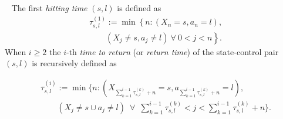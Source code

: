 \documentclass[opre,sglanonrev]{informs4}
\numberwithin{equation}{section}
\newcommand{\pow}[1]{^{(#1)}}
\newcommand{\lc}{\left\{}
\newcommand{\rc}{\right\}}
\newcommand{\ldot}{\left.}
\newcommand{\rdot}{\right.}
\begin{document}
{\begin{definition}~\label{def:return-time}
The first \emph{hitting time} $(s,l)$ is defined as
\begin{align*}
&\tau_{s,l}\pow{1}:=\min\lc n: (X_n=s,a_n=l),\rdot\\
&\qquad \ldot(X_j\neq s,a_j\neq l)\  \forall \ 0<j<n \rc.
\end{align*}
When $i\geq2$ the $i$-th {\emph{time to return}} (or {\emph{return time}}) of the state-control pair $(s,l)$ is recursively defined as 
\begin{small}
\begin{align*}
  &\tau^{(i)}_{s,l}:= \min\{n:(X_{\sum_{k=1}^{i-1}\tau^{(k)}_{s,l}+n}=s,a_{\sum_{k=1}^{i-1}\tau^{(k)}_{s,l}+n}=l),\\
  &\qquad (X_{j}\neq s\cup a_{j}\neq l)\enspace\forall \enspace \sum_{k=1}^{i-1}\tau^{(k)}_{s,l}<j<\sum_{k=1}^{i-1}\tau^{(k)}_{s,l}+n\}.  
\end{align*}
\end{small}
\end{definition}
{
}}
\end{document}
